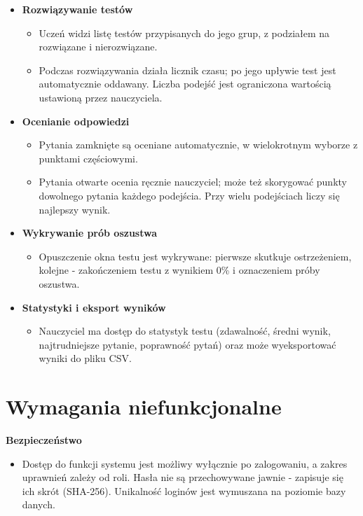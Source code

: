 \begin{itemize}
  \item \textbf{Rozwiązywanie testów}
  \begin{itemize}
    \item Uczeń widzi listę testów przypisanych do jego grup, z podziałem na rozwiązane
          i nierozwiązane.
    \item Podczas rozwiązywania działa licznik czasu; po jego upływie test jest automatycznie
          oddawany. Liczba podejść jest ograniczona wartością ustawioną przez nauczyciela.
  \end{itemize}

  \item \textbf{Ocenianie odpowiedzi}
  \begin{itemize}
    \item Pytania zamknięte są oceniane automatycznie, w wielokrotnym wyborze z punktami częściowymi.
    \item Pytania otwarte ocenia ręcznie nauczyciel; może też skorygować punkty dowolnego pytania
          każdego podejścia. Przy wielu podejściach liczy się najlepszy wynik.
  \end{itemize}

  \item \textbf{Wykrywanie prób oszustwa}
  \begin{itemize}
    \item Opuszczenie okna testu jest wykrywane: pierwsze skutkuje ostrzeżeniem, kolejne -
          zakończeniem testu z wynikiem 0\% i oznaczeniem próby oszustwa.
  \end{itemize}

  \item \textbf{Statystyki i eksport wyników}
  \begin{itemize}
    \item Nauczyciel ma dostęp do statystyk testu (zdawalność, średni wynik, najtrudniejsze pytanie,
          poprawność pytań) oraz może wyeksportować wyniki do pliku CSV.
  \end{itemize}
\end{itemize}

\section{Wymagania niefunkcjonalne}
\label{sec:wymaganiaNiefunkcjonalne}

\textbf{Bezpieczeństwo}
\begin{itemize}
  \item Dostęp do funkcji systemu jest możliwy wyłącznie po zalogowaniu, a zakres uprawnień zależy
        od roli. Hasła nie są przechowywane jawnie - zapisuje się ich skrót (SHA-256). Unikalność
        loginów jest wymuszana na poziomie bazy danych.
\end{itemize}

